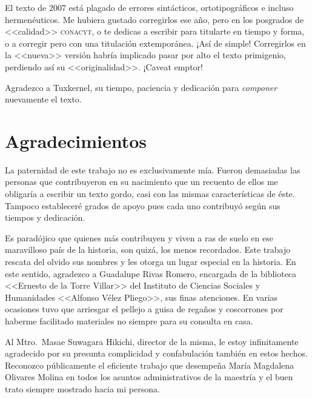 \documentclass[14pt,twoside,final]{extbook} %
\begin{document}
El texto de 2007 está plagado de errores sintácticos, ortotipográficos e incluso hermenéuticos. Me hubiera gustado corregirlos ese año, pero en los posgrados de <<calidad>> \textsc{conacyt}, o te dedicas a escribir para titularte en tiempo y forma, o a corregir pero con una titulación extemporánea. ¡Así de simple! Corregirlos en la <<nueva>> versión habría implicado pasar por alto el texto primigenio, perdiendo así su <<originalidad>>. ¡Caveat emptor!

Agradezco a Tuxkernel, su tiempo, paciencia y dedicación para \emph{componer} nuevamente el texto.
\chapter*{Agradecimientos}\label{ch:agradecimientos}
\thispagestyle{empty}
\pagestyle{fancy}
\fancyhf{} %
\fancyhead[LE,RO]{\thepage}
\renewcommand{\headrulewidth}{0pt}
\setcounter{page}{7}
La paternidad de este trabajo no es exclusivamente mía. Fueron demasiadas las personas que contribuyeron en su nacimiento que un recuento de ellos me obligaría a escribir un texto gordo, casi con las mismas características de éste. Tampoco estableceré grados de apoyo pues cada uno contribuyó según sus tiempos y dedicación.

Es paradójico que quienes más contribuyen y viven a ras de suelo en ese maravilloso país de la historia, son quizá, los menos recordados. Este trabajo rescata del olvido sus nombres y les otorga un lugar especial en la historia. En este sentido, agradezco a Guadalupe Rivas Romero, encargada de la biblioteca <<Ernesto de la Torre Villar>> del Instituto de Ciencias Sociales y Humanidades <<Alfonso Vélez Pliego>>, sus finas atenciones. En varias ocasiones tuvo que arriesgar el pellejo a guisa de regaños y coscorrones por haberme facilitado materiales no siempre para su consulta en casa.

Al Mtro.~Masae Suwagara Hikichi, director de la misma, le estoy infinitamente agradecido por su presunta complicidad y confabulación también en estos hechos. Reconozco públicamente el eficiente trabajo que desempeña María Magdalena Olivares Molina en todos los asuntos administrativos de la maestría y el buen trato siempre mostrado hacia mi persona.
\end{document}
